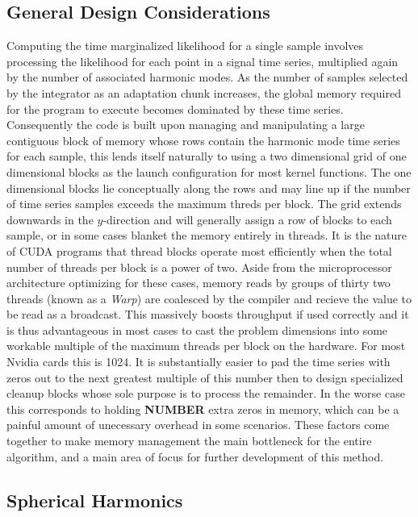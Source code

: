 \subsection{General Design Considerations}
Computing the time marginalized likelihood for a single sample involves processing the likelihood for each point in a signal time series, multiplied again by the number of associated harmonic modes. As the number of samples selected by the integrator as an adaptation chunk increases, the global memory required for the program to execute becomes dominated by these time series. Consequently the code is built upon managing and manipulating a large contiguous block of memory whose rows contain the harmonic mode time series for each sample, this lends itself naturally to using a two dimensional grid of one dimensional blocks as the launch configuration for most kernel functions. The one dimensional blocks lie conceptually along the rows and may line up if the number of time series samples exceeds the maximum threds per block. The grid extends downwards in the $y$-direction and will generally assign a row of blocks to each sample, or in some cases blanket the memory entirely in threads.
It is the nature of CUDA programs that thread blocks operate most efficiently when the total number of threads per block is a power of two. Aside from the microprocessor architecture optimizing for these cases, memory reads by groups of thirty two threads (known as a \textit{Warp}) are coalesced by the compiler and recieve the value to be read as a broadcast. This massively boosts throughput if used correctly and it is thus advantageous in most cases to cast the problem dimensions into some workable multiple of the maximum threads per block on the hardware. For most Nvidia cards this is 1024. It is substantially easier to pad the time series with zeros out to the next greatest multiple of this number then to design specialized cleanup blocks whose sole purpose is to process the remainder. In the worse case this corresponds to holding \textbf{NUMBER} extra zeros in memory, which can be a painful amount of unecessary overhead in some scenarios. These factors come together to make memory management the main bottleneck for the entire algorithm, and a main area of focus for further development of this method.      

\subsection{Spherical Harmonics}

